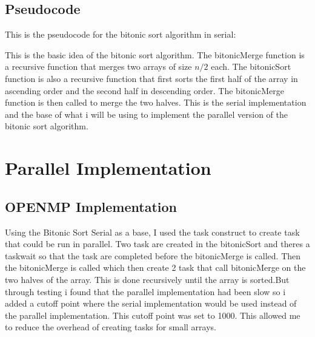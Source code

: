 \subsection*{Pseudocode}
This is the pseudocode for the bitonic sort algorithm in serial:\\
\begin{algorithm2e}
\end{algorithm2e}
This is the basic idea of the bitonic sort algorithm. The bitonicMerge function
is a recursive function that merges two arrays of size $n/2$ each. The
bitonicSort function is also a recursive function that first sorts the first
half of the array in ascending order and the second half in descending order.
The bitonicMerge function is then called to merge the two halves.
This is the serial implementation and the base of what i will be using to
implement the parallel version of the bitonic sort algorithm.

\section*{Parallel Implementation}

\subsection*{OPENMP Implementation}
Using the Bitonic Sort Serial as a base, I used the task construct to create
task that could be run in parallel. Two task are created in the bitonicSort and
theres a taskwait so that the task are completed before the bitonicMerge is
called. Then the bitonicMerge is called which then create 2 task that call
bitonicMerge on the two halves of the array. This is done recursively until the
array is sorted.But through testing i found that the parallel implementation
had been slow so i added a cutoff point where the serial implementation would
be used instead of the parallel implementation. This cutoff point was set to
1000. This allowed me to reduce the overhead of creating tasks for small
arrays.

